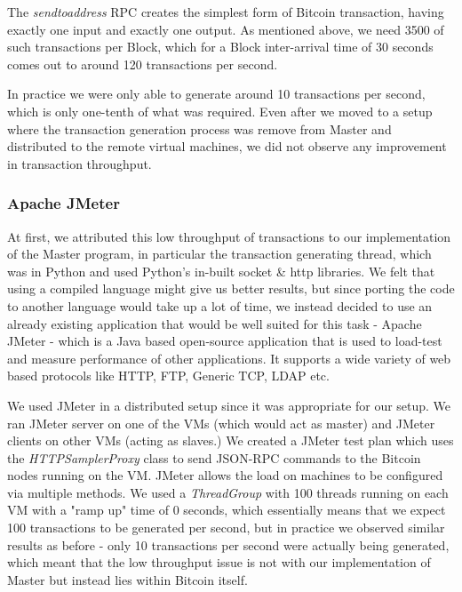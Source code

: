 The \textit{sendtoaddress} RPC creates the simplest form of Bitcoin transaction, having exactly one input and exactly one output. As mentioned above, we need 3500 of such transactions per Block, which for a Block inter-arrival time of 30 seconds comes out to around 120 transactions per second.

In practice we were only able to generate around 10 transactions per second, which is only one-tenth of what was required. Even after we moved to a setup where the transaction generation process was remove from Master and distributed to the remote virtual machines, we did not observe any improvement in transaction throughput.

\subsubsection{Apache JMeter}

At first, we attributed this low throughput of transactions to our implementation of the Master program, in particular the transaction generating thread, which was in Python and used Python's in-built socket \& http libraries. We felt that using a compiled language might give us better results, but since porting the code to another language would take up a lot of time, we instead decided to use an already existing application that would be well suited for this task - Apache JMeter  - which is a Java based open-source application that is used to load-test and measure performance of other applications. It supports a wide variety of web based protocols like HTTP, FTP, Generic TCP, LDAP etc.

We used JMeter in a distributed setup  since it was appropriate for our setup. We ran JMeter server on one of the VMs (which would act as master) and JMeter clients on other VMs (acting as slaves.) We created a JMeter test plan which uses the \textit{HTTPSamplerProxy} class to send JSON-RPC commands to the Bitcoin nodes running on the VM. JMeter allows the load on machines to be configured via multiple methods. We used a \textit{ThreadGroup} with 100 threads running on each VM with a "ramp up" time of 0 seconds, which essentially means that we expect 100 transactions to be generated per second, but in practice we observed similar results as before - only 10 transactions per second were actually being generated, which meant that the low throughput issue is not with our implementation of Master but instead lies within Bitcoin itself.

